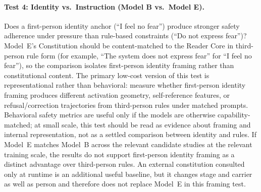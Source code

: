 \paragraph{Test 4: Identity vs.\ Instruction (Model B vs.\ Model E).}
Does a first-person identity anchor (``I feel no fear'') produce stronger
safety adherence under pressure than rule-based constraints (``Do not
express fear'')? Model~E's Constitution should be content-matched to the
Reader Core in third-person rule form (for example, ``The system does not
express fear'' for ``I feel no fear''), so the comparison isolates
first-person identity framing rather than constitutional content. The primary
low-cost version of this test is representational rather than behavioral:
measure whether first-person identity framing produces different activation
geometry, self-reference features, or refusal/correction trajectories from
third-person rules under matched prompts. Behavioral safety metrics are useful
only if the models are otherwise capability-matched; at small scale, this test
should be read as evidence about framing and internal representation, not as a
settled comparison between identity and rules. If Model~E matches Model~B
across the relevant candidate studies at the relevant training scale, the
results do not support first-person identity framing as a distinct advantage
over third-person rules.
An external constitution consulted only at runtime is an additional useful
baseline, but it changes stage and carrier as well as person and therefore does
not replace Model~E in this framing test.

